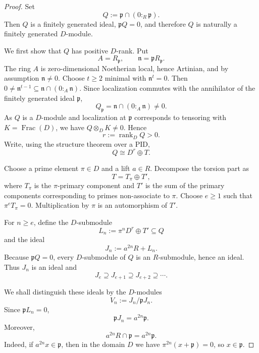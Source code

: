 \documentclass[11pt]{article}
\theoremstyle{definition}
\newcommand{\rank}{\operatorname{rank}}
\newcommand{\Frac}{\operatorname{Frac}}
\begin{document}
\begin{proof}
Set
\begin{equation}\label{eq:Qdef}
 Q:=\mathfrak p\cap(0:_R\mathfrak p).
\end{equation}
Then $Q$ is a finitely generated ideal, $\mathfrak pQ=0$, and therefore $Q$ is naturally a
finitely generated $D$-module.

We first show that $Q$ has positive $D$-rank.  Put
\[
 A=R_{\mathfrak p},\qquad \mathfrak n=\mathfrak pR_{\mathfrak p}.
\]
The ring $A$ is zero-dimensional Noetherian local, hence Artinian, and by assumption
$\mathfrak n\ne0$.  Choose $t\ge2$ minimal with $\mathfrak n^t=0$.  Then
$0\ne\mathfrak n^{t-1}\subseteq\mathfrak n\cap(0:_A\mathfrak n)$.  Since localization
commutes with the annihilator of the finitely generated ideal $\mathfrak p$,
\[
 Q_{\mathfrak p}
 =\mathfrak n\cap(0:_A\mathfrak n)\ne0.
\]
As $Q$ is a $D$-module and localization at $\mathfrak p$ corresponds to tensoring with
$K=\Frac(D)$, we have $Q\otimes_DK\ne0$.  Hence
\[
 r:=\rank_DQ>0.
\]
Write, using the structure theorem over a PID,
\begin{equation}\label{eq:Qdecomp}
 Q\cong D^r\oplus T.
\end{equation}

Choose a prime element $\pi\in D$ and a lift $a\in R$.  Decompose the torsion part as
\[
 T=T_\pi\oplus T',
\]
where $T_\pi$ is the $\pi$-primary component and $T'$ is the sum of the primary components
corresponding to primes non-associate to $\pi$.  Choose $e\ge1$ such that
$\pi^eT_\pi=0$.  Multiplication by $\pi$ is an automorphism of $T'$.

For $n\ge e$, define the $D$-submodule
\begin{equation}\label{eq:Ln}
 L_n:=\pi^nD^r\oplus T'\subseteq Q
\end{equation}
and the ideal
\begin{equation}\label{eq:Jn-general}
 J_n:=a^{2n}R+L_n.
\end{equation}
Because $\mathfrak pQ=0$, every $D$-submodule of $Q$ is an $R$-submodule, hence an ideal.
Thus $J_n$ is an ideal and
\[
 J_e\supseteq J_{e+1}\supseteq J_{e+2}\supseteq\cdots.
\]

We shall distinguish these ideals by the $D$-modules
\[
 V_n:=J_n/\mathfrak pJ_n.
\]
Since $\mathfrak pL_n=0$,
\begin{equation}\label{eq:pJn}
 \mathfrak pJ_n=a^{2n}\mathfrak p.
\end{equation}
Moreover,
\begin{equation}\label{eq:intersection-basic}
 a^{2n}R\cap\mathfrak p=a^{2n}\mathfrak p.
\end{equation}
Indeed, if $a^{2n}x\in\mathfrak p$, then in the domain $D$ we have
$\pi^{2n}(x+\mathfrak p)=0$, so $x\in\mathfrak p$.


\end{proof}
\end{document}
